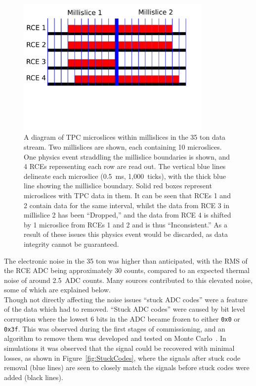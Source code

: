 \begin{figure}
  \centering
  \includegraphics[width=0.85\textwidth]{DataDrops}
  \caption[Dropped TPC data in the 35 ton]
          {A diagram of TPC microslices within millislices in the 35 ton data stream. Two millislices are shown, each containing 10 microslices. One physics event straddling the millislice boundaries is shown, and 4 RCEs representing each row are read out. The vertical blue lines delineate each microslice (0.5~ms, 1,000~ticks), with the thick blue line showing the millislice boundary. Solid red boxes represent microslices with TPC data in them. It can be seen that RCEs 1 and 2 contain data for the same interval, whilst the data from RCE 3 in millislice 2 has been ``Dropped,'' and the data from RCE 4 is shifted by 1 microslice from RCEs 1 and 2 and is thus ``Inconsistent.'' As a result of these issues this physics event would be discarded, as data integrity cannot be guaranteed.}
  \label{fig:DataDrops}
\end{figure}

The electronic noise in the 35 ton was higher than anticipated, with the RMS of the RCE ADC being approximately 30 counts, compared to an expected thermal noise of around 2.5~ADC counts. Many sources contributed to this elevated noise, some of which are explained below. \\

Though not directly affecting the noise issues ``stuck ADC codes'' were a feature of the data which had to removed. ``Stuck ADC codes'' were caused by bit level corruption where the lowest 6 bits in the ADC became frozen to either {\tt 0x0} or {\tt 0x3f}. This was observed during the first stages of commissioning, and an algorithm to remove them was developed and tested on Monte Carlo~\citep{InslerStuckCode}. In simulations it was observed that the signal could be recovered with minimal losses, as shown in Figure~\ref{fig:StuckCodes}, where the signals after stuck code removal (blue lines) are seen to closely match the signals before stuck codes were added (black lines). \\

